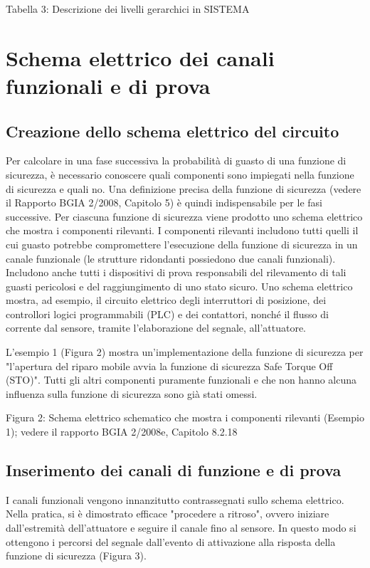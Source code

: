 \documentclass[a4paper,11pt]{article}
\begin{document}
    Tabella 3: Descrizione dei livelli gerarchici in SISTEMA
    
    \clearpage

    \section{Schema elettrico dei canali funzionali e di prova}
    \subsection{Creazione dello schema elettrico del circuito}
    \par\medskip\noindent Per calcolare in una fase successiva la probabilità di guasto di una funzione di sicurezza, è necessario conoscere quali componenti sono impiegati nella funzione di sicurezza e quali no. Una definizione precisa della funzione di sicurezza (vedere il Rapporto BGIA 2/2008, Capitolo 5) è quindi indispensabile per le fasi successive. Per ciascuna funzione di sicurezza viene prodotto uno schema elettrico che mostra i componenti rilevanti. I componenti rilevanti includono tutti quelli il cui guasto potrebbe compromettere l'esecuzione della funzione di sicurezza in un canale funzionale (le strutture ridondanti possiedono due canali funzionali). Includono anche tutti i dispositivi di prova responsabili del rilevamento di tali guasti pericolosi e del raggiungimento di uno stato sicuro. Uno schema elettrico mostra, ad esempio, il circuito elettrico degli interruttori di posizione, dei controllori logici programmabili (PLC) e dei contattori, nonché il flusso di corrente dal sensore, tramite l'elaborazione del segnale, all'attuatore.
    
    \par\medskip\noindent L'esempio 1 (Figura 2) mostra un'implementazione della funzione di sicurezza per "l'apertura del riparo mobile avvia la funzione di sicurezza Safe Torque Off (STO)". Tutti gli altri componenti puramente funzionali e che non hanno alcuna influenza sulla funzione di sicurezza sono già stati omessi.

    Figura 2: Schema elettrico schematico che mostra i componenti rilevanti (Esempio 1); vedere il rapporto BGIA 2/2008e, Capitolo 8.2.18

    \subsection{Inserimento dei canali di funzione e di prova}
    \par\medskip\noindent I canali funzionali vengono innanzitutto contrassegnati sullo schema elettrico. Nella pratica, si è dimostrato efficace "procedere a ritroso", ovvero iniziare dall'estremità dell'attuatore e seguire il canale fino al sensore. In questo modo si ottengono i percorsi del segnale dall'evento di attivazione alla risposta della funzione di sicurezza (Figura 3).
\end{document}
